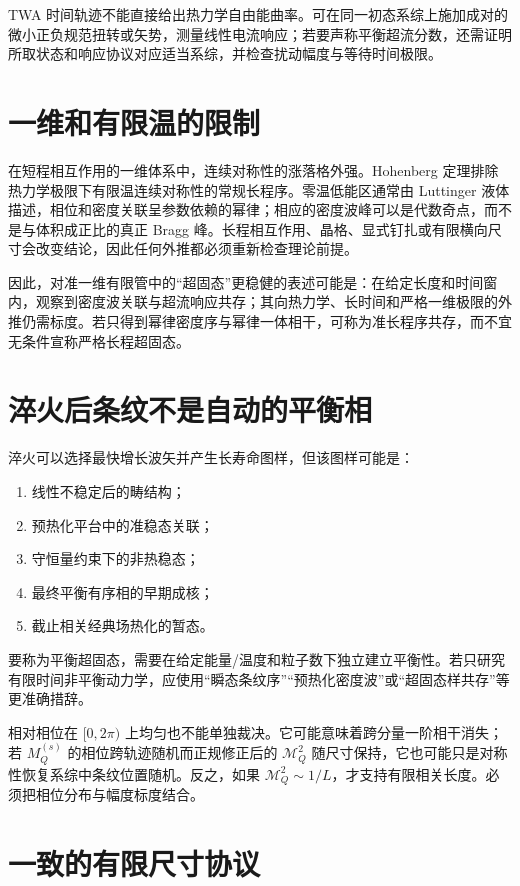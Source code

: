 TWA 时间轨迹不能直接给出热力学自由能曲率。可在同一初态系综上施加成对的微小正负规范扭转或矢势，测量线性电流响应；若要声称平衡超流分数，还需证明所取状态和响应协议对应适当系综，并检查扰动幅度与等待时间极限。

\section{一维和有限温的限制}

在短程相互作用的一维体系中，连续对称性的涨落格外强。Hohenberg 定理排除热力学极限下有限温连续对称性的常规长程序\cite{Hohenberg1967}。零温低能区通常由 Luttinger 液体描述，相位和密度关联呈参数依赖的幂律\cite{Haldane1981,Cazalilla2004}；相应的密度波峰可以是代数奇点，而不是与体积成正比的真正 Bragg 峰。长程相互作用、晶格、显式钉扎或有限横向尺寸会改变结论，因此任何外推都必须重新检查理论前提。

因此，对准一维有限管中的“超固态”更稳健的表述可能是：在给定长度和时间窗内，观察到密度波关联与超流响应共存；其向热力学、长时间和严格一维极限的外推仍需标度。若只得到幂律密度序与幂律一体相干，可称为准长程序共存，而不宜无条件宣称严格长程超固态。

\section{淬火后条纹不是自动的平衡相}

淬火可以选择最快增长波矢并产生长寿命图样，但该图样可能是：
\begin{enumerate}
  \item 线性不稳定后的畴结构；
  \item 预热化平台中的准稳态关联；
  \item 守恒量约束下的非热稳态；
  \item 最终平衡有序相的早期成核；
  \item 截止相关经典场热化的暂态。
\end{enumerate}
要称为平衡超固态，需要在给定能量/温度和粒子数下独立建立平衡性。若只研究有限时间非平衡动力学，应使用“瞬态条纹序”“预热化密度波”或“超固态样共存”等更准确措辞。

相对相位在 $[0,2\pi)$ 上均匀也不能单独裁决。它可能意味着跨分量一阶相干消失；若 $M_Q^{(s)}$ 的相位跨轨迹随机而正规修正后的 $\mathcal M_Q^2$ 随尺寸保持，它也可能只是对称性恢复系综中条纹位置随机。反之，如果 $\mathcal M_Q^2\sim1/L$，才支持有限相关长度。必须把相位分布与幅度标度结合。

\section{一致的有限尺寸协议}


